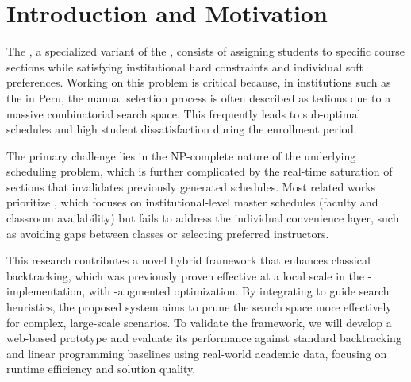 
\section{Introduction and Motivation}
The \PSTP, a specialized variant of the \SSP, consists of assigning students to specific course sections while satisfying institutional hard constraints and individual soft preferences. Working on this problem is critical because, in institutions such as the \UNI in Peru, the manual selection process is often described as tedious due to a massive combinatorial search space. This frequently leads to sub-optimal schedules and high student dissatisfaction during the enrollment period.

The primary challenge lies in the NP-complete nature of the underlying scheduling problem, which is further complicated by the real-time saturation of sections that invalidates previously generated schedules. Most related works prioritize \ET, which focuses on institutional-level master schedules (faculty and classroom availability) but fails to address the individual convenience layer, such as avoiding gaps between classes or selecting preferred instructors.

This research contributes a novel hybrid framework that enhances classical backtracking, which was previously proven effective at a local scale in the \FIIS-\UNI implementation, with \AI-augmented optimization. By integrating \DRL to guide search heuristics, the proposed system aims to prune the search space more effectively for complex, large-scale scenarios. To validate the framework, we will develop a web-based prototype and evaluate its performance against standard backtracking and linear programming baselines using real-world academic data, focusing on runtime efficiency and solution quality.
